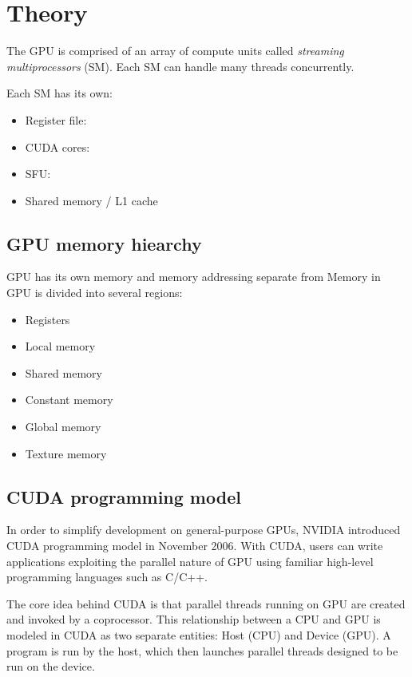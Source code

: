 \documentclass{article}
\begin{document}
\section{Theory}

The GPU is comprised of an array of compute units called \textit{streaming multiprocessors} (SM). Each SM can handle many threads concurrently.

Each SM has its own:

\begin{itemize}
    \item Register file:
    \item CUDA cores:
    \item SFU:
    \item Shared memory / L1 cache
\end{itemize}

\subsection{GPU memory hiearchy}

GPU has its own memory and memory addressing separate from
Memory in GPU is divided into several regions:

\begin{itemize}
    \item Registers
    \item Local memory
    \item Shared memory
    \item Constant memory
    \item Global memory
    \item Texture memory
\end{itemize}

\subsection{CUDA programming model}
In order to simplify development on general-purpose GPUs, NVIDIA introduced CUDA programming model in November 2006. With CUDA, users can write applications exploiting the parallel nature of GPU using familiar high-level programming languages such as C/C++.

The core idea behind CUDA is that parallel threads running on GPU are created and invoked by a coprocessor. This relationship between a CPU and GPU is modeled in CUDA as two separate entities: Host (CPU) and Device (GPU). A program is run by the host, which then launches parallel threads designed to be run on the device.
\end{document}
